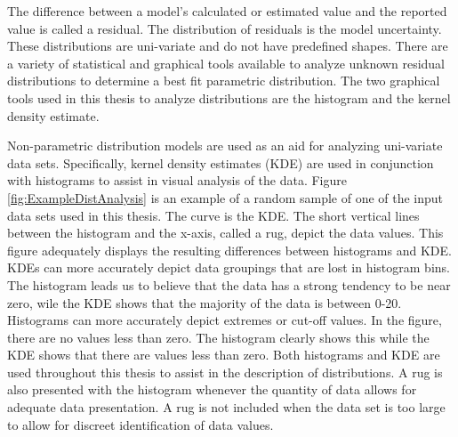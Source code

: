 \begin{linenumbers}
The difference between a model's calculated or estimated value and the reported value is called a residual.  The distribution of residuals is the model uncertainty.  These distributions are uni-variate and do not have predefined shapes.  There are a variety of statistical and graphical tools available to analyze unknown residual distributions to determine a best fit parametric distribution.  The two graphical tools used in this thesis to analyze distributions are the histogram and the kernel density estimate.

Non-parametric distribution models are used as an aid for analyzing uni-variate data sets.  Specifically, kernel density estimates (KDE) are used in conjunction with histograms to assist in visual analysis of the data.  Figure \ref{fig:ExampleDistAnalysis} is an example of a random sample of one of the input data sets used in this thesis.  The curve is the KDE.  The short vertical lines between the histogram and the x-axis, called a rug, depict the data values.  This figure adequately displays the resulting differences between histograms and KDE.  KDEs can more accurately depict data groupings that are lost in histogram bins.  The histogram leads us to believe that the data has a strong tendency to be near zero, wile the KDE shows that the majority of the data is between 0-20.  Histograms can more accurately depict extremes or cut-off values.  In the figure, there are no values less than zero.  The histogram clearly shows this while the KDE shows that there are values less than zero.  Both histograms and KDE are used throughout this thesis to assist in the description of distributions.  A rug is also presented with the histogram whenever the quantity of data allows for adequate data presentation.  A rug is not included when the data set is too large to allow for discreet identification of data values.


\end{linenumbers}
